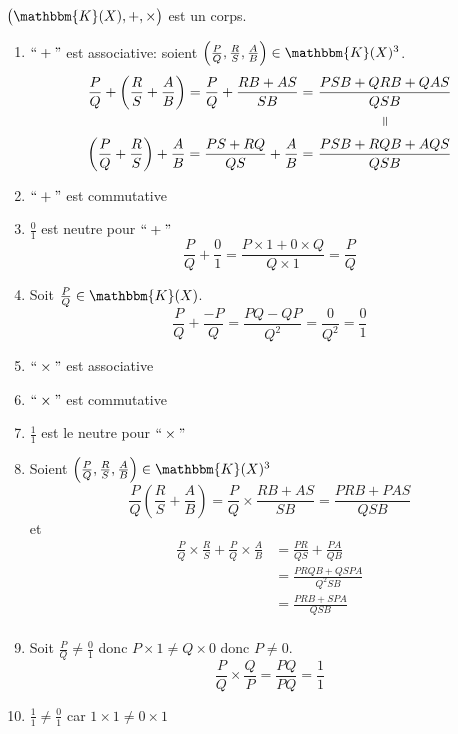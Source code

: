 \begin{thm}
	$\big(\mathbbm{K}(X), +, \times\big)$ est un corps.
\end{thm}

\begin{prv}
	[partielle]
	\begin{enumerate}
		\item $``+"$ est associative: soient $\left(\frac{P}{Q}, \frac{R}{S}, \frac{A}{B}\right) \in \mathbbm{K}(X)^3$.
			\begin{align*}
				\frac{P}{Q} + \left( \frac{R}{S} + \frac{A}{B} \right) = \frac{P}{Q} + \frac{RB+AS}{SB} = &~\frac{PSB + QRB + QAS}{QSB}\\
				&\quad\qquad\qquad\vrt=\\
				\left( \frac{P}{Q} + \frac{R}{S} \right) + \frac{A}{B} = \frac{PS+RQ}{QS} + \frac{A}{B} = &~\frac{PSB+ RQB + AQS}{QSB}
			\end{align*}
		\item $``+"$ est commutative
		\item $\frac{0}{1}$ est neutre pour $``+"$ 
			\[
				\frac{P}{Q} + \frac{0}{1} = \frac{P\times 1 + 0 \times Q}{Q \times 1} = \frac{P}{Q}
			\]
		\item Soit $\frac{P}{Q} \in \mathbbm{K}(X)$. \[
				\frac{P}{Q} + \frac{-P}{Q} = \frac{PQ - QP}{Q^2} = \frac{0}{Q^2} = \frac{0}{1}
			\]
		\item $``\times"$ est associative
		\item $``\times"$ est commutative
		\item $\frac{1}{1}$ est le neutre pour $``\times"$ 
		\item Soient $\left( \frac{P}{Q}, \frac{R}{S}, \frac{A}{B} \right) \in \mathbbm{K}(X)^3$
			\[
				\frac{P}{Q}\left( \frac{R}{S}+ \frac{A}{B} \right) = 
				\frac{P}{Q}\times \frac{RB+AS}{SB} = 
				\frac{PRB + PAS}{QSB}
			\] et
			\begin{align*}
				\frac{P}{Q} \times \frac{R}{S} + \frac{P}{Q} \times  \frac{A}{B} &= \frac{PR}{QS} + \frac{PA}{QB} \\
				&= \frac{PRQB + QSPA}{Q^2SB} \\
				&= \frac{PRB + SPA}{QSB} \\
			\end{align*}
		\item Soit $\frac{P}{Q} \neq \frac{0}{1}$ donc $P\times 1 \neq Q \times 0$ donc $P \neq 0$.
			\[
				\frac{P}{Q} \times \frac{Q}{P} = \frac{PQ}{PQ}= \frac{1}{1}
			\]
		\item $\frac{1}{1}\neq \frac{0}{1}$ car $1\times 1 \neq 0\times 1$
	\end{enumerate}
\end{prv}

